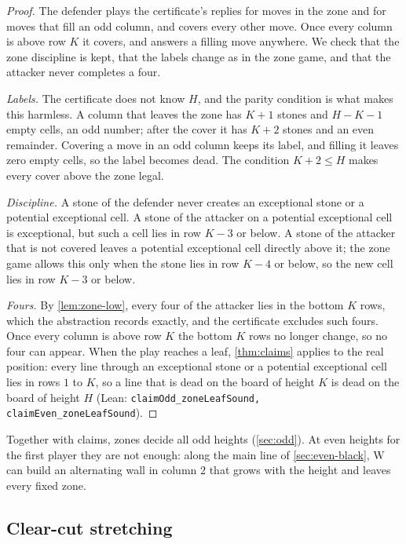 \documentclass[11pt,a4paper]{article}
\theoremstyle{plain}
\theoremstyle{definition}
\newcommand{\code}[1]{{\upshape\texttt{\small\nolinkurl{#1}}}}
\newcommand{\leanref}[1]{(Lean: \code{#1})}
\newcommand{\W}{\mathrm{W}}
\begin{document}
\begin{proof}
The defender plays the certificate's replies for moves in the zone and for moves that fill an odd column, and covers every other move. Once every column is above row $K$ it covers, and answers a filling move anywhere. We check that the zone discipline is kept, that the labels change as in the zone game, and that the attacker never completes a four.

\emph{Labels.} The certificate does not know $H$, and the parity condition is what makes this harmless. A column that leaves the zone has $K+1$ stones and $H-K-1$ empty cells, an odd number; after the cover it has $K+2$ stones and an even remainder. Covering a move in an odd column keeps its label, and filling it leaves zero empty cells, so the label becomes dead. The condition $K+2\le H$ makes every cover above the zone legal.

\emph{Discipline.} A stone of the defender never creates an exceptional stone or a potential exceptional cell. A stone of the attacker on a potential exceptional cell is exceptional, but such a cell lies in row $K-3$ or below. A stone of the attacker that is not covered leaves a potential exceptional cell directly above it; the zone game allows this only when the stone lies in row $K-4$ or below, so the new cell lies in row $K-3$ or below.

\emph{Fours.} By \cref{lem:zone-low}, every four of the attacker lies in the bottom $K$ rows, which the abstraction records exactly, and the certificate excludes such fours. Once every column is above row $K$ the bottom $K$ rows no longer change, so no four can appear. When the play reaches a leaf, \cref{thm:claims} applies to the real position: every line through an exceptional stone or a potential exceptional cell lies in rows $1$ to $K$, so a line that is dead on the board of height $K$ is dead on the board of height $H$ \leanref{claimOdd_zoneLeafSound, claimEven_zoneLeafSound}.
\end{proof}

Together with claims, zones decide all odd heights (\cref{sec:odd}). At even heights for the first player they are not enough: along the main line of \cref{sec:even-black}, $\W$ can build an alternating wall in column $2$ that grows with the height and leaves every fixed zone.

\subsection{Clear-cut stretching}
\label{sec:stretch}
\end{document}
